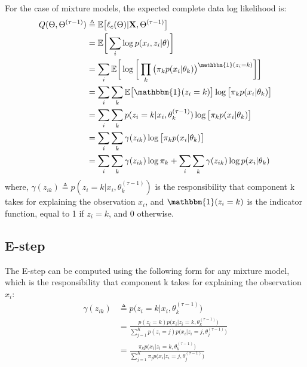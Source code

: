For the case of mixture models, the expected complete data log likelihood is:
\begin{equation} \label{log-lik-expected-derivation-f-mm}
	\begin{aligned}
		Q(\Theta, \Theta^{(\tau-1)}) & \triangleq \mathbb{E} \big[\ell_{c}(\Theta) | \mathbf{X}, \Theta^{(\tau-1)}\big] \\
								& = \mathbb{E} \bigg[ \sum_{i} \log p(x_{i}, z_{i}|\theta) \bigg] \\
								& = \sum_{i} \mathbb{E} \bigg[ \log \bigg[\prod_{k} \big( \pi_{k}p(x_{i}|\theta_{k})\big)^{\mathbbm{1}(z_{i}=k)} \bigg]\bigg] \\
								& = \sum_{i} \sum_{k} \mathbb{E} \big[\mathbbm{1}(z_{i}=k)\big] \log \big[\pi_{k}p(x_{i}|\theta_{k})\big] \\
								& = \sum_{i} \sum_{k} p(z_{i}=k|x_{i},\theta_{k}^{(\tau-1)}) \log \big[\pi_{k}p(x_{i}|\theta_{k})\big] \\
								& = \sum_{i} \sum_{k} \gamma(z_{ik}) \log \big[\pi_{k}p(x_{i}|\theta_{k})\big] \\
								& = \sum_{i} \sum_{k} \gamma(z_{ik}) \log \pi_{k} + \sum_{i} \sum_{k} \gamma(z_{ik}) \log p(x_{i}|\theta_{k}) \\		
	\end{aligned}
\end{equation}
where, $\gamma(z_{ik}) \triangleq p(z_{i}=k|x_{i},\theta_{k}^{(\tau-1)})$ is the responsibility that component k takes for explaining the observation $x_{i}$, and $\mathbbm{1}(z_{i}=k)$ is the indicator function, equal to 1 if $z_{i}=k$, and 0 otherwise.

\subsection*{E-step}
The E-step can be computed using the following form for any mixture model, which is the responsibility that component k takes for explaining the observation $x_{i}$:
\begin{equation} \label{responsibilities-f-mm}
  \begin{aligned}
	\gamma(z_{ik}) & \triangleq p\big(z_{i}=k|x_{i},\theta_{k}^{(\tau-1)}\big) \\
				   & = \frac{p(z_{i}=k)p\big(x_{i}|z_{i}=k,\theta_{k}^{(\tau-1)}\big)}{\sum\limits_{j=1}^{K} p(z_{i}=j)p\big(x_{i}|z_{i}=j,\theta_{j}^{(\tau-1)}\big)} \\
				   & = \frac{\pi_{k}p\big(x_{i}|z_{i}=k,\theta_{k}^{(\tau-1)}\big)}{\sum\limits_{j=1}^{K} \pi_{j}p\big(x_{i}|z_{i}=j,\theta_{j}^{(\tau-1)}\big)}
  \end{aligned}
\end{equation}

